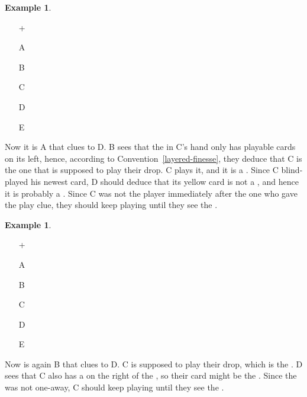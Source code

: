 \documentclass[a4paper]{article}
\theoremstyle{plain}
\theoremstyle{definition}
\newtheorem{example}[theorem]{Example}
\begin{document}
\begin{example}	\hfill \\
	\begin{minipage}{0.45\textwidth}
		\begin{itemize}
			\item[\Large +]      
			\item[\Large A]    
			\item[\Large B]    
			\item[\Large C]    
			\item[\Large D]    
			\item[\Large E]    
		\end{itemize}
	\end{minipage}%
	\begin{minipage}{0.55\textwidth}
		Now it is A that clues  to D. B sees that the  in C's hand only has playable cards on its left, hence, according to Convention~\ref{layered-finesse}, they deduce that C is the one that is supposed to play their drop. C plays it, and it is a . Since C blind-played his newest card, D should deduce that its yellow card is not a , and hence it is probably a . Since C was not the player immediately after the one who gave the play clue, they should keep playing until they see the .
	\end{minipage}
\end{example} \vspace{0.15 cm}

\begin{example}	\hfill \\
	\begin{minipage}{0.45\textwidth}
		\begin{itemize}
			\item[\Large +]      
			\item[\Large A]    
			\item[\Large B]    
			\item[\Large C]    
			\item[\Large D]    
			\item[\Large E]    
		\end{itemize}
	\end{minipage}%
	\begin{minipage}{0.55\textwidth}
		Now is again B that clues  to D. C is supposed to play their drop, which is the . D sees that C also has a  on the right of the , so their card might be the . Since the  was not one-away, C should keep playing until they see the .
	\end{minipage}
\end{example} \vspace{0.15 cm}
\end{document}
